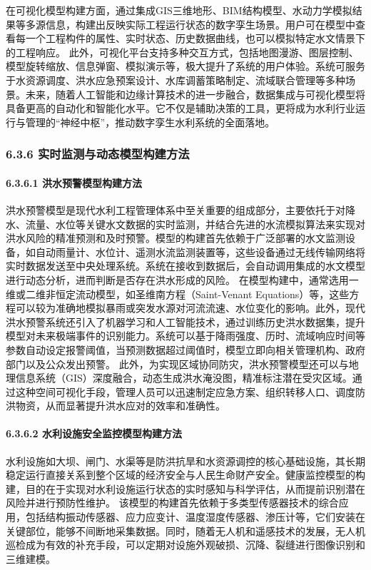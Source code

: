 在可视化模型构建方面，通过集成GIS三维地形、BIM结构模型、水动力学模拟结果等多源信息，构建出反映实际工程运行状态的数字孪生场景。用户可在模型中查看每一个工程构件的属性、实时状态、历史数据曲线，也可以模拟特定水文情景下的工程响应。 此外，可视化平台支持多种交互方式，包括地图漫游、图层控制、模型旋转缩放、信息弹窗、模拟演示等，极大提升了系统的用户体验。系统可服务于水资源调度、洪水应急预案设计、水库调蓄策略制定、流域联合管理等多种场景。未来，随着人工智能和边缘计算技术的进一步融合，数据集成与可视化模型将具备更高的自动化和智能化水平。它不仅是辅助决策的工具，更将成为水利行业运行与管理的``神经中枢''，推动数字孪生水利系统的全面落地。 \subsubsection{6.3.6 实时监测与动态模型构建方法}\label{ux5b9eux65f6ux76d1ux6d4bux4e0eux52a8ux6001ux6a21ux578bux6784ux5efaux65b9ux6cd5} \paragraph{6.3.6.1 洪水预警模型构建方法}\label{ux6d2aux6c34ux9884ux8b66ux6a21ux578bux6784ux5efaux65b9ux6cd5} 洪水预警模型是现代水利工程管理体系中至关重要的组成部分，主要依托于对降水、流量、水位等关键水文数据的实时监测，并结合先进的水流模拟算法来实现对洪水风险的精准预测和及时预警。模型的构建首先依赖于广泛部署的水文监测设备，如自动雨量计、水位计、遥测水流监测装置等，这些设备通过无线传输网络将实时数据发送至中央处理系统。系统在接收到数据后，会自动调用集成的水文模型进行动态分析，进而判断是否存在洪水形成的风险。 在模型构建中，通常选用一维或二维非恒定流动模型，如圣维南方程（Saint-Venant Equations）等，这些方程可以较为准确地模拟暴雨或突发水源对河流流速、水位变化的影响。此外，现代洪水预警系统还引入了机器学习和人工智能技术，通过训练历史洪水数据集，提升模型对未来极端事件的识别能力。系统可以基于降雨强度、历时、流域响应时间等参数自动设定报警阈值，当预测数据超过阈值时，模型立即向相关管理机构、政府部门以及公众发出预警。 此外，为实现区域协同防灾，洪水预警模型还可以与地理信息系统（GIS）深度融合，动态生成洪水淹没图，精准标注潜在受灾区域。通过这种空间可视化手段，管理人员可以迅速制定应急方案、组织转移人口、调度防洪物资，从而显著提升洪水应对的效率和准确性。 \paragraph{6.3.6.2 水利设施安全监控模型构建方法}\label{ux6c34ux5229ux8bbeux65bdux5b89ux5168ux76d1ux63a7ux6a21ux578bux6784ux5efaux65b9ux6cd5} 水利设施如大坝、闸门、水渠等是防洪抗旱和水资源调控的核心基础设施，其长期稳定运行直接关系到整个区域的经济安全与人民生命财产安全。健康监控模型的构建，目的在于实现对水利设施运行状态的实时感知与科学评估，从而提前识别潜在风险并进行预防性维护。 该模型的构建首先依赖于多类型传感器技术的综合应用，包括结构振动传感器、应力应变计、温度湿度传感器、渗压计等，它们安装在关键部位，能够不间断地采集数据。同时，随着无人机和遥感技术的发展，无人机巡检成为有效的补充手段，可以定期对设施外观破损、沉降、裂缝进行图像识别和三维建模。 